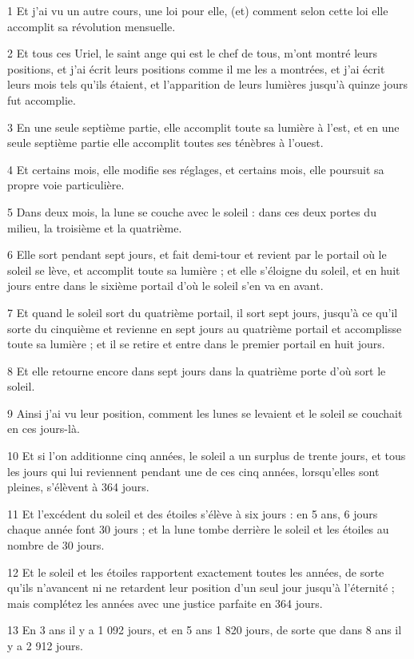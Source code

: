 \par 1 Et j'ai vu un autre cours, une loi pour elle, (et) comment selon cette loi elle accomplit sa révolution mensuelle.
\par 2 Et tous ces Uriel, le saint ange qui est le chef de tous, m'ont montré leurs positions, et j'ai écrit leurs positions comme il me les a montrées, et j'ai écrit leurs mois tels qu'ils étaient, et l'apparition de leurs lumières jusqu'à quinze jours fut accomplie.
\par 3 En une seule septième partie, elle accomplit toute sa lumière à l'est, et en une seule septième partie elle accomplit toutes ses ténèbres à l'ouest.
\par 4 Et certains mois, elle modifie ses réglages, et certains mois, elle poursuit sa propre voie particulière.
\par 5 Dans deux mois, la lune se couche avec le soleil : dans ces deux portes du milieu, la troisième et la quatrième.
\par 6 Elle sort pendant sept jours, et fait demi-tour et revient par le portail où le soleil se lève, et accomplit toute sa lumière ; et elle s'éloigne du soleil, et en huit jours entre dans le sixième portail d'où le soleil s'en va en avant.
\par 7 Et quand le soleil sort du quatrième portail, il sort sept jours, jusqu'à ce qu'il sorte du cinquième et revienne en sept jours au quatrième portail et accomplisse toute sa lumière ; et il se retire et entre dans le premier portail en huit jours.
\par 8 Et elle retourne encore dans sept jours dans la quatrième porte d'où sort le soleil.
\par 9 Ainsi j'ai vu leur position, comment les lunes se levaient et le soleil se couchait en ces jours-là.
\par 10 Et si l'on additionne cinq années, le soleil a un surplus de trente jours, et tous les jours qui lui reviennent pendant une de ces cinq années, lorsqu'elles sont pleines, s'élèvent à 364 jours.
\par 11 Et l'excédent du soleil et des étoiles s'élève à six jours : en 5 ans, 6 jours chaque année font 30 jours ; et la lune tombe derrière le soleil et les étoiles au nombre de 30 jours.
\par 12 Et le soleil et les étoiles rapportent exactement toutes les années, de sorte qu'ils n'avancent ni ne retardent leur position d'un seul jour jusqu'à l'éternité ; mais complétez les années avec une justice parfaite en 364 jours.
\par 13 En 3 ans il y a 1 092 jours, et en 5 ans 1 820 jours, de sorte que dans 8 ans il y a 2 912 jours.
